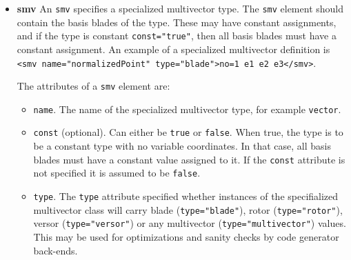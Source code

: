 \documentclass[10pt, a4paper]{article}
\begin{document}
\begin{itemize}
         
\item {\bf smv} An {\tt smv} specifies a specialized multivector type. 
      The {\tt smv} element should contain the basis blades of the type. These may have constant assignments, and if the
      type is constant {\tt const="true"}, then all basis blades must have a constant assignment. An example of a specialized
      multivector definition is {\tt <smv name="normalizedPoint" type="blade">no=1 e1 e2 e3</smv>}.
      
      The attributes of a {\tt smv} element are:
       \begin{itemize}
       \item {\tt name}. The name of the specialized multivector type, for example {\tt vector}.
       \item {\tt const} (optional). Can either be {\tt true} or {\tt false}. When true, the type is to be a constant type with no
           variable coordinates. In that case, all basis blades must have a constant value assigned to it. If the {\tt const}
           attribute is not specified it is assumed to be {\tt false}.
       \item {\tt type}. The {\tt type} attribute specified whether instances of the specifialized multivector class will carry
           blade ({\tt type="blade"}), rotor ({\tt type="rotor"}), versor ({\tt type="versor"}) or any multivector 
           ({\tt type="multivector"}) values. This may be used for optimizations and sanity checks by code generator back-ends.
       \end{itemize}
       

\end{itemize}
\end{document}
